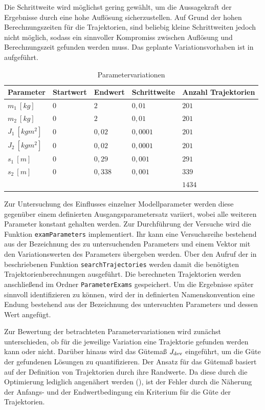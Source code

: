 Die Schrittweite wird möglichst gering gewählt, um die Aussagekraft der Ergebnisse durch eine hohe Auflösung sicherzustellen. Auf Grund der hohen Berechnungszeiten für die Trajektorien, sind beliebig kleine Schrittweiten jedoch nicht möglich, sodass ein sinnvoller Kompromiss zwischen Auflösung und Berechnungszeit gefunden werden muss. Das geplante Variationsvorhaben ist in  aufgeführt.
\begin{table}[h]
	\centering
	\caption{Parametervariationen}
		\begin{tabular}{lllll}
			Parameter & Startwert & Endwert & Schrittweite & Anzahl Trajektorien \\
			\midrule
			$m_1 \ [\unit{kg}]$     & $0$ & $2$    & $0,01$   & $201$ \\
			$m_2 \ [\unit{kg}]$     & $0$ & $2$    & $0,01$   & $201$ \\
			$J_1 \ [\unit{kgm^2}]$  & $0$ & $0,02$ & $0,0001$ & $201$ \\
			$J_2 \ [\unit{kgm^2}]$  & $0$ & $0,02$ & $0,0001$ & $201$ \\
		  $s_1 \ [\unit{m}]$      & $0$ & $0,29$ & $0,001$  & $291$ \\
			$s_2 \ [\unit{m}]$      & $0$ & $0,338$& $0,001$  & $339$ \\
			\midrule
			                        &     &        &          & $1434$ \
		\end{tabular}
	\label{tab:Parametervariationen}
\end{table}

Zur Untersuchung des Einflusses einzelner Modellparameter werden diese gegenüber einem definierten Ausgangsparametersatz variiert, wobei alle weiteren Parameter konstant gehalten werden. Zur Durchführung der Versuche wird die Funktion \texttt{examParameters} implementiert. Ihr kann eine Versuchsreihe bestehend aus der Bezeichnung des zu untersuchenden Parameters und einem Vektor mit den Variationswerten des Parameters übergeben werden. Über den Aufruf der in  beschriebenen Funktion \texttt{searchTrajectories} werden damit die benötigten Trajektorienberechnungen ausgeführt. Die berechneten Trajektorien werden anschließend im Ordner \texttt{ParameterExams} gespeichert. Um die Ergebnisse später sinnvoll identifizieren zu können, wird der in  definierten Namenskonvention eine Endung bestehend aus der Bezeichnung des untersuchten Parameters und dessen Wert angefügt. 

Zur Bewertung der betrachteten Parametervariationen wird zunächst unterschieden, ob für die jeweilige Variation eine Trajektorie gefunden werden kann oder nicht. Darüber hinaus wird das Gütemaß $J_{\mathrm{dev}}$ eingeführt, um die Güte der gefundenen Lösungen zu quantifizieren. Der Ansatz für das Gütemaß basiert auf der Definition von Trajektorien durch ihre Randwerte. Da diese durch die Optimierung lediglich angenähert werden (\vgl {}), ist der Fehler durch die Näherung der Anfangs- und der Endwertbedingung ein Kriterium für die Güte der Trajektorien.

